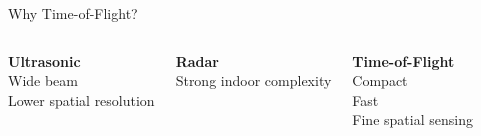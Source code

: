 \documentclass[aspectratio=169]{beamer}
\begin{document}
\begin{frame}{Why Time-of-Flight?}
    \vspace{1cm}
    \begin{columns}[t]
        \begin{center}
            {\Large \bfseries Ultrasonic} \\[0.8cm]
            \textcolor{errorred}{} Wide beam \\[0.3cm]
            \textcolor{errorred}{} Lower spatial resolution
        \end{center}
        
        \begin{center}
            {\Large \bfseries Radar} \\[0.8cm]
            \textcolor{errorred}{} Strong indoor complexity
        \end{center}
        
        \begin{center}
            {\Large \bfseries \textcolor{accent}{Time-of-Flight}} \\[0.8cm]
            \textcolor{successgreen}{} Compact \\[0.3cm]
            \textcolor{successgreen}{} Fast \\[0.3cm]
            \textcolor{successgreen}{} Fine spatial sensing
        \end{center}
    \end{columns}
\end{frame}
\end{document}
